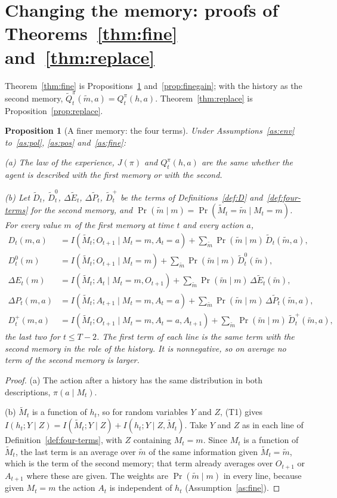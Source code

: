 \documentclass{article}
\newtheorem{proposition}{Proposition}[section]
\theoremstyle{definition}
\newcommand{\dE}{\Delta E}
\newcommand{\dP}{\Delta P}
\begin{document}
\section{Changing the memory: proofs of Theorems~\ref{thm:fine} and~\ref{thm:replace}}\label{sec:memproof}

Theorem~\ref{thm:fine} is Propositions~\ref{prop:fineterms} and~\ref{prop:finegain}; with the history as the second memory, $\tilde Q^\pi_t(\tilde m,a)=Q^\pi_t(h,a)$. Theorem~\ref{thm:replace} is Proposition~\ref{prop:replace}.

\begin{proposition}[A finer memory: the four terms]\label{prop:fineterms}
Under Assumptions~\ref{as:env} to~\ref{as:pol}, \ref{as:pos} and~\ref{as:fine}:

(a) The law of the experience, $J(\pi)$ and $Q^\pi_t(h,a)$ are the same whether the agent is described with the first memory or with the second.

(b) Let $\tilde D_t$, $\tilde D^0_t$, $\Delta\tilde E_t$, $\Delta\tilde P_t$, $\tilde D^+_t$ be the terms of Definitions~\ref{def:D} and~\ref{def:four-terms} for the second memory, and $\Pr(\tilde m\mid m)=\Pr(\tilde M_t=\tilde m\mid M_t=m)$. For every value $m$ of the first memory at time $t$ and every action $a$,
\begin{align*}
D_t(m,a)&=I(\tilde M_t;O_{t+1}\mid M_t=m,A_t=a)+\sum_{\tilde m}\Pr(\tilde m\mid m)\,\tilde D_t(\tilde m,a),\\
D^0_t(m)&=I(\tilde M_t;O_{t+1}\mid M_t=m)+\sum_{\tilde m}\Pr(\tilde m\mid m)\,\tilde D^0_t(\tilde m),\\
\dE_t(m)&=I(\tilde M_t;A_t\mid M_t=m,O_{t+1})+\sum_{\tilde m}\Pr(\tilde m\mid m)\,\Delta\tilde E_t(\tilde m),\\
\dP_t(m,a)&=I(\tilde M_t;A_{t+1}\mid M_t=m,A_t=a)+\sum_{\tilde m}\Pr(\tilde m\mid m)\,\Delta\tilde P_t(\tilde m,a),\\
D^+_t(m,a)&=I(\tilde M_t;O_{t+1}\mid M_t=m,A_t=a,A_{t+1})+\sum_{\tilde m}\Pr(\tilde m\mid m)\,\tilde D^+_t(\tilde m,a),
\end{align*}
the last two for $t\le T-2$. The first term of each line is the same term with the second memory in the role of the history. It is nonnegative, so on average no term of the second memory is larger.
\end{proposition}

\begin{proof}
(a) The action after a history has the same distribution in both descriptions, $\pi(a\mid M_t)$.

(b) $\tilde M_t$ is a function of $h_t$, so for random variables $Y$ and $Z$, (T1) gives $I(h_t;Y\mid Z)=I(\tilde M_t;Y\mid Z)+I(h_t;Y\mid Z,\tilde M_t)$. Take $Y$ and $Z$ as in each line of Definition~\ref{def:four-terms}, with $Z$ containing $M_t=m$. Since $M_t$ is a function of $\tilde M_t$, the last term is an average over $\tilde m$ of the same information given $\tilde M_t=\tilde m$, which is the term of the second memory; that term already averages over $O_{t+1}$ or $A_{t+1}$ where these are given. The weights are $\Pr(\tilde m\mid m)$ in every line, because given $M_t=m$ the action $A_t$ is independent of $h_t$ (Assumption~\ref{as:fine}).
\end{proof}
\end{document}
